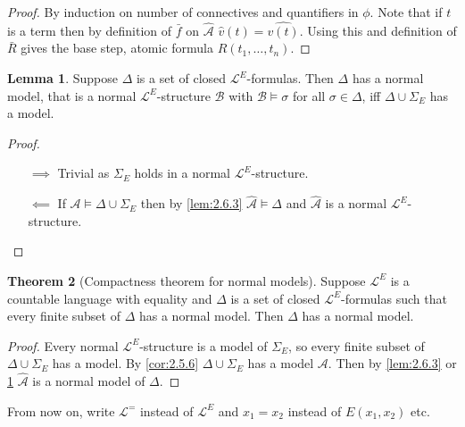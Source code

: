 \documentclass{article}
\newcommand{\rb}[1]{\left( #1 \right)}
\theoremstyle{definition}\newtheorem{definition}{Definition}[subsection]
\theoremstyle{definition}\newtheorem{remark}[definition]{Remark}
\theoremstyle{definition}\newtheorem*{example}{Example}
\theoremstyle{definition}\newtheorem*{note}{Note}
\newtheorem{lemma}[definition]{Lemma}
\newtheorem{theorem}[definition]{Theorem}
\begin{document}
\begin{proof}
By induction on number of connectives and quantifiers in $ \phi $. Note that if $ t $ is a term then by definition of $ \bar{f} $ on $ \hat{\mathcal{A}} $ $ \hat{v}\rb{t} = \widehat{v\rb{t}} $. Using this and definition of $ \bar{R} $ gives the base step, atomic formula $ R\rb{t_1, \dots, t_n} $.
\end{proof}

\begin{lemma}
\label{lem:2.6.4}
Suppose $ \Delta $ is a set of closed $ \mathcal{L}^E $-formulas. Then $ \Delta $ has a normal model, that is a normal $ \mathcal{L}^E $-structure $ \mathcal{B} $ with $ \mathcal{B} \vDash \sigma $ for all $ \sigma \in \Delta $, iff $ \Delta \cup \Sigma_E $ has a model.
\end{lemma}

\begin{proof}
\hfill
\begin{itemize}
\item[$ \implies $] Trivial as $ \Sigma_E $ holds in a normal $ \mathcal{L}^E $-structure.
\item[$ \impliedby $] If $ \mathcal{A} \vDash \Delta \cup \Sigma_E $ then by \ref{lem:2.6.3} $ \hat{\mathcal{A}} \vDash \Delta $ and $ \hat{\mathcal{A}} $ is a normal $ \mathcal{L}^E $-structure.
\end{itemize}
\end{proof}

\begin{theorem}[Compactness theorem for normal models]
Suppose $ \mathcal{L}^E $ is a countable language with equality and $ \Delta $ is a set of closed $ \mathcal{L}^E $-formulas such that every finite subset of $ \Delta $ has a normal model. Then $ \Delta $ has a normal model.
\end{theorem}

\begin{proof}
Every normal $ \mathcal{L}^E $-structure is a model of $ \Sigma_E $, so every finite subset of $ \Delta \cup \Sigma_E $ has a model. By \ref{cor:2.5.6} $ \Delta \cup \Sigma_E $ has a model $ \mathcal{A} $. Then by \ref{lem:2.6.3} or \ref{lem:2.6.4} $ \hat{\mathcal{A}} $ is a normal model of $ \Delta $.
\end{proof}

From now on, write $ \mathcal{L}^= $ instead of $ \mathcal{L}^E $ and $ x_1 = x_2 $ instead of $ E\rb{x_1, x_2} $ etc.
\end{document}

